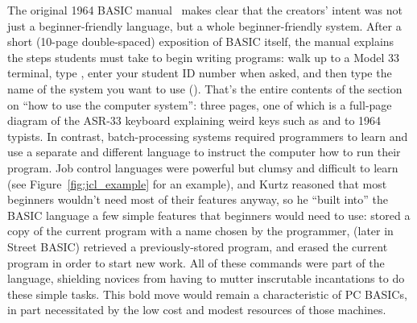 The original 1964 BASIC manual~\cite[p. 14]{dartmouth_basic_manual}
makes clear that the creators' intent was not just a beginner-friendly
language, but a whole beginner-friendly system.
After a short (10-page double-spaced) exposition of BASIC itself, the
manual explains the steps students must take to begin writing programs:
walk up to a Model 33 terminal, type , enter your student ID
number when asked, and then type the name of the system you want to use
().
That's the entire contents of the section on ``how to use the computer
system'': three pages, one of which is a full-page diagram of the ASR-33
keyboard explaining weird keys such as  and  to 1964
typists.
In contrast, batch-processing systems required programmers to learn and
use a separate and different  language to instruct the
computer how to run their program.
Job control languages were powerful but clumsy and difficult to learn
(see Figure~\ref{fig:jcl_example} for an example), and Kurtz reasoned
that most beginners wouldn't need most of their features anyway, so he
``built into'' the BASIC language a few simple features that beginners
would need to use:  stored a copy of the current program with a
name chosen by the programmer,  (later  in Street BASIC)
retrieved a previously-stored program, and  erased the current
program in order to start new work.
All of these commands were part of the language, shielding novices
from having to mutter inscrutable incantations to do these simple
tasks.
This bold move would remain a characteristic of PC BASICs, in part
necessitated by the low cost and modest resources of those machines.





